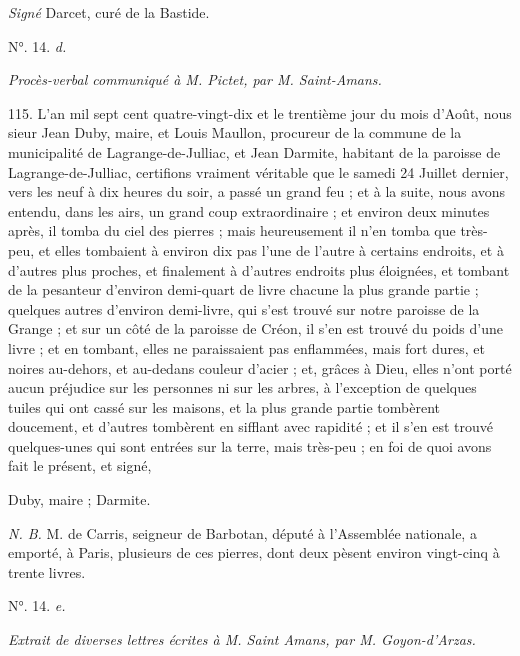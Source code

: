 \documentclass[a4paper, 11pt, oneside, polutonikogreek, french]{article}
\begin{document}
\emph{Signé} Darcet, curé de la Bastide.

\begin{center}
N°. 14. \emph{d.}
\end{center}

\begin{center}
\emph{Procès-verbal communiqué à M. Pictet, par M. Saint-Amans.}
\end{center}

115. L'an mil sept cent quatre-vingt-dix et le trentième jour du mois d'Août, nous sieur Jean Duby, maire, et Louis Maullon, procureur de la commune de la municipalité de Lagrange-de-Julliac, et Jean Darmite, habitant de la paroisse de Lagrange-de-Julliac, certifions vraiment véritable que le samedi 24 Juillet dernier, vers les neuf à dix heures du soir, a passé un grand feu ; et à la suite, nous avons entendu, dans les airs, un grand coup extraordinaire ; et environ deux minutes après, il tomba du ciel des pierres ; mais heureusement il n'en tomba que très-peu, et elles tombaient à environ dix pas l'une de l'autre à certains endroits, et à d'autres plus proches, et finalement à d'autres endroits plus éloignées, et tombant de la pesanteur d'environ demi-quart de livre chacune la plus grande partie ; quelques autres d'environ demi-livre, qui s'est trouvé sur notre paroisse de la Grange ; et sur un côté de la paroisse de Créon, il s'en est trouvé du poids d'une livre ; et en tombant, elles ne paraissaient pas enflammées, mais fort dures, et noires au-dehors, et au-dedans couleur d'acier ; et, grâces à Dieu, elles n'ont porté aucun préjudice sur les personnes ni sur les arbres, à l'exception de quelques tuiles qui ont cassé sur les maisons, et la plus grande partie tombèrent doucement, et d'autres tombèrent en sifflant avec rapidité ; et il s'en est trouvé quelques-unes qui sont entrées sur la terre, mais très-peu ; en foi de quoi avons fait le présent, et signé,

Duby, maire ; Darmite.

\emph{N. B.} M. de Carris, seigneur de Barbotan, député à l'Assemblée nationale, a emporté, à Paris, plusieurs de ces pierres, dont deux pèsent environ vingt-cinq à trente livres.

\begin{center}
N°. 14. \emph{e.}
\end{center}

\begin{center}
\emph{Extrait de diverses lettres écrites à M. Saint Amans, par M. Goyon-d'Arzas.}
\end{center}
\end{document}

